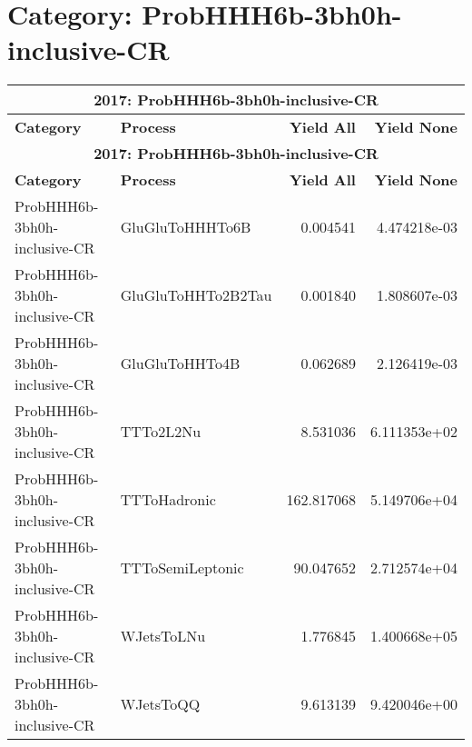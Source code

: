 \documentclass{article}
\begin{document}
\section*{Category: ProbHHH6b-3bh0h-inclusive-CR}
\begin{longtable}[c]{|l|l|r|r|}
\hline
\multicolumn{4}{|c|}{\textbf{2017: ProbHHH6b-3bh0h-inclusive-CR}} \\
\hline
\textbf{Category} & \textbf{Process} & \textbf{Yield All} & \textbf{Yield None} \\
\hline
\endfirsthead
\hline
\multicolumn{4}{|c|}{\textbf{2017: ProbHHH6b-3bh0h-inclusive-CR}} \\
\hline
\textbf{Category} & \textbf{Process} & \textbf{Yield All} & \textbf{Yield None} \\
\hline
\endhead
ProbHHH6b-3bh0h-inclusive-CR & GluGluToHHHTo6B & 0.004541 & 4.474218e-03 \\
\hline
ProbHHH6b-3bh0h-inclusive-CR & GluGluToHHTo2B2Tau & 0.001840 & 1.808607e-03 \\
\hline
ProbHHH6b-3bh0h-inclusive-CR & GluGluToHHTo4B & 0.062689 & 2.126419e-03 \\
\hline
ProbHHH6b-3bh0h-inclusive-CR & TTTo2L2Nu & 8.531036 & 6.111353e+02 \\
\hline
ProbHHH6b-3bh0h-inclusive-CR & TTToHadronic & 162.817068 & 5.149706e+04 \\
\hline
ProbHHH6b-3bh0h-inclusive-CR & TTToSemiLeptonic & 90.047652 & 2.712574e+04 \\
\hline
ProbHHH6b-3bh0h-inclusive-CR & WJetsToLNu & 1.776845 & 1.400668e+05 \\
\hline
ProbHHH6b-3bh0h-inclusive-CR & WJetsToQQ & 9.613139 & 9.420046e+00 \\
\hline
\end{longtable}
\end{document}
